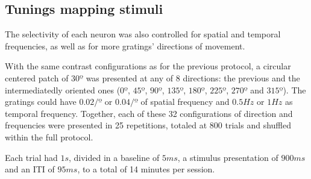 \subsection{Tunings mapping stimuli}
\label{subsec:subbsectionC}

The selectivity of each neuron was also controlled for spatial and temporal frequencies, as well as for more gratings' directions of movement. 

With the same contrast configurations as for the previous protocol, a circular centered patch of $30º$ was presented at any of 8 directions: the previous and the intermediatedly oriented ones ($0º$, $45º$, $90º$, $135º$, $180º$, $225º$, $270º$ and $315º$). The gratings could have $0.02 /º$ or $0.04 /º$ of spatial frequency and $0.5 Hz$ or $1 Hz$ as temporal frequency. Together, each of these 32 configurations of direction and frequencies were presented in 25 repetitions, totaled at 800 trials and shuffled within the full protocol.

Each trial had $1 s$, divided in a baseline of $5 ms$, a stimulus presentation of $900 ms$ and an ITI of $95 ms$, to a total of 14 minutes per session.

\begin{table}[H]
\begin{center}\par
{}
 \caption{Configurations regarding the tuning mapping protocol stimuli properties.}
    \vspace{-5mm}
    \label{table:tuning}
\end{center}
\end{table}

